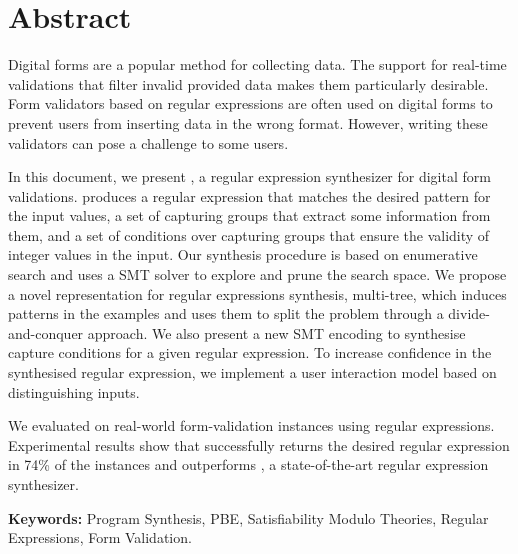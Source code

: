 \section*{Abstract}

Digital forms are a popular method for collecting data.
The support for real-time validations that filter invalid provided data makes them particularly desirable.
Form validators based on regular expressions are often used on digital forms to prevent users from inserting data in the wrong format.
However, writing these validators can pose a challenge to some users.

In this document, we present \Forest, a regular expression synthesizer for digital form validations.
\Forest produces a regular expression that matches the desired pattern for the input values, a set of capturing groups that extract some information from them,
and 
a set of conditions over capturing groups that ensure the validity of integer values in the input.
Our synthesis procedure is based on enumerative search and uses a \ac{SMT} solver to explore and prune the search space.
We propose a novel representation for regular expressions synthesis, multi-tree, which induces patterns in the examples and uses them to split the problem through a divide-and-conquer approach.
We also present a new \ac{SMT} encoding to synthesise capture conditions for a given regular expression.
To increase confidence in the synthesised regular expression, we implement a user interaction model based on distinguishing inputs. 

We evaluated \Forest{} on real-world form-validation instances using regular expressions. Experimental results show that \Forest{} successfully returns the desired regular expression in 74\% of the instances and outperforms \Regel, a state-of-the-art regular expression synthesizer.

\vfill
\noindent
\textbf{\Large Keywords:} Program Synthesis, \acl{PBE}, Satisfiability Modulo Theories, Regular Expressions, Form Validation.
\cleardoublepage
